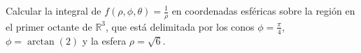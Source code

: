 \documentclass[12pt]{article}
\begin{document}
Calcular la integral de \( f(\rho, \phi, \theta) = \frac{1}{\rho} \) en coordenadas esféricas sobre la región en el primer octante de \( \mathbb{R}^3 \), que está delimitada por los conos \( \phi = \frac{\pi}{4} \), \( \phi = \arctan(2) \) y la esfera \( \rho = \sqrt{6} \).
\end{document}
